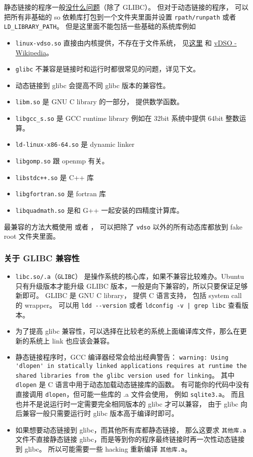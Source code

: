 静态链接的程序一般\href{https://stackoverflow.com/questions/31801824/is-static-linking-in-linux-portable}{没什么问题}（除了 GLIBC）。 但对于动态链接的程序， 可以把所有非基础的 so 依赖库打包到一个文件夹里面并设置 \verb`rpath/runpath` 或者 \verb`LD_LIBRARY_PATH`。 但是这里面不能包括一些基础的系统库例如
\begin{itemize}
\item \verb`linux-vdso.so` 直接由内核提供，不存在于文件系统， 见\href{https://unix.stackexchange.com/questions/476971/ldd-shows-no-location-after-arrow-library-does-not-exist-on-system}{这里} 和 \href{https://en.wikipedia.org/wiki/VDSO}{vDSO - Wikipedia}。
\item \verb`glibc` 不兼容是链接时和运行时都很常见的问题，详见下文。
\item 动态链接到 glibc 会提高不同 glibc 版本的兼容性。
\item \verb`libm.so` 是 GNU C library 的一部分， 提供数学函数。
\item \verb`libgcc_s.so` 是 GCC runtime library 例如在 32bit 系统中提供 64bit 整数运算。
\item \verb`ld-linux-x86-64.so` 是 dynamic linker
\item \verb`libgomp.so` 跟 openmp 有关。
\item \verb`libstdc++.so` 是 C++ 库
\item \verb`libgfortran.so` 是 fortran 库
\item \verb`libquadmath.so` 是和 G++ 一起安装的四精度计算库。
\end{itemize}

最兼容的方法大概使用  或者 ， 可以把除了 \verb`vdso` 以外的所有动态库都放到 fake root 文件夹里面。

\subsubsection{关于 GLIBC 兼容性}
\begin{itemize}
\item \verb`libc.so/.a`（\verb`GLIBC`） 是操作系统的核心库，如果不兼容比较难办。Ubuntu 只有升级版本才能升级 GLIBC 版本，一般是向下兼容的，所以只要保证足够新即可。 GLIBC 是 GNU C library， 提供 C 语言支持， 包括 system call 的 wrapper。 可以用 \verb`ldd --version` 或者 \verb`ldconfig -v | grep libc` 查看版本。
\item 为了提高 glibc 兼容性，可以选择在比较老的系统上面编译库文件，那么在更新的系统上 link 也应该会兼容。
\item 静态链接程序时，GCC 编译器经常会给出经典警告： \verb`warning: Using 'dlopen' in statically linked applications requires at runtime the shared libraries from the glibc version used for linking`。 其中 \verb`dlopen` 是 C 语言中用于动态加载动态链接库的函数。 有可能你的代码中没有直接调用 \verb`dlopen`，但可能一些库的 .a 文件会使用， 例如 \verb`sqlite3.a`。 而且也并不是说运行时一定需要完全相同版本的 glibc 才可以兼容， 由于 glibc 向后兼容一般只需要运行时 glibc 版本高于编译时即可。
\item 如果想要动态链接到 glibc，而其他所有库都静态链接， 那么这要求 \verb`其他库.a` 文件不直接静态链接 glibc，而是等到你的程序最终链接时再一次性动态链接到 glibc。 所以可能需要一些 hacking 重新编译 \verb`其他库.a`。
\end{itemize}

